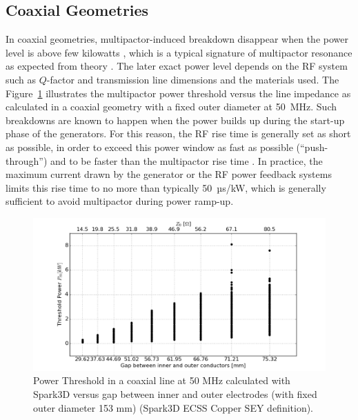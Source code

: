 \subsection{Coaxial Geometries} 
In coaxial geometries, multipactor-induced breakdown disappear when the power level is above few kilowatts , which is a typical signature of multipactor resonance as expected from theory  . The later exact power level depends on the RF system such as $Q$-factor and transmission line dimensions and the materials used. The Figure~\ref{fig:powerthresholdcoax} illustrates the multipactor power threshold versus the line impedance as calculated in a coaxial geometry with a fixed outer diameter at 50~MHz. Such breakdowns are known to happen when the power builds up during the start-up phase of the generators. For this reason, the RF rise time is generally set as short as possible, in order to exceed this power window as fast as possible (“push-through”) and to be faster than the multipactor rise time . In practice, the maximum current drawn by the generator or the RF power feedback systems limits this rise time to no more than typically 50~µs/kW, which is generally sufficient to avoid multipactor during power ramp-up. 



\begin{figure}[h]
	\centering
	\includegraphics[width=1.0\linewidth]{figures/chap4/power_threshold_coax}
	\caption{Power Threshold in a coaxial line at 50 MHz calculated with Spark3D versus gap between inner and outer electrodes (with fixed outer diameter 153 mm) (Spark3D ECSS Copper SEY definition).}
	\label{fig:powerthresholdcoax}
\end{figure}


